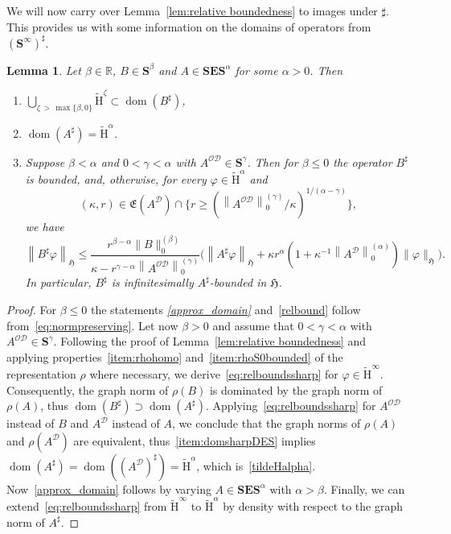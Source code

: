 \documentclass[10pt]{amsart}
\newtheorem{lemm}[theo]{Lemma}\newtheorem{prop}[theo]{Proposition}\newtheorem{coro}[theo]{Corollary}\newtheorem{conj}[theo]{Conjecture}
\theoremstyle{definition}\newtheorem{defi}[theo]{Definition}\newtheorem{rema}[theo]{Remark}\newtheorem{exam}[theo]{Example}\newtheorem{nota}[theo]{Notation}
\DeclareMathOperator{\dom}{dom}
\renewcommand{\mathsf}{\mathrm}
\newcommand{\sfH}{\mathsf{H}}
\newcommand{\R}{\mathbb R}
\newcommand{\CD}{\mathcal{D}}
\newcommand{\CO}{\mathcal{O}}
\newcommand{\BE}{\mathbf E}
\newcommand{\BS}{\mathbf S}
\newcommand{\FE}{\mathfrak{E}}
\newcommand{\FH}{\mathfrak H}
\renewcommand{\phi}{\varphi}
\renewcommand{\subseteq}{\subset}
\renewcommand{\supseteq}{\supset}
\newcommand{\er}{r}
\begin{document}
We will now carry over Lemma~\ref{lem:relative boundedness} to images under $\sharp$. This provides us with some information on the domains of operators from $(\BS^\infty)^\sharp$.
\begin{lemm}\label{lem:relboundsrho}
Let $\beta\in\R$, $B\in\BS^\beta$ and $A\in\BS\BE\BS^\alpha$ for some $\alpha>0$. Then
\begin{enumerate}
\item\label{approx_domain}
$\bigcup_{\zeta\,>\,\max\{\beta, 0\}}\widetilde{\sfH}^\zeta\subseteq\dom(B^\sharp)$,
\item\label{tildeHalpha}
$\dom(A^\sharp)=\widetilde{\sfH}^\alpha$.
\item\label{relbound}
Suppose $\beta < \alpha$ and $0 <\gamma < \alpha$ with $A^{\CO\CD}\in \BS^\gamma$. Then for $\beta\le 0$ the operator $B^\sharp$ is bounded, and, otherwise, for every $\phi\in\widetilde{\sfH}^\alpha$ and
\[
(\kappa, \er)\in\FE\left(A^\CD\right)\cap \Big\{\er
\geq\left(\left\|A^{\CO\CD}\right\|_0^{(\gamma)}/\kappa\right)^{1/(\alpha
-\gamma)}\Big\},
\]
we have
\begin{equation}\label{eq:relboundssharp}
\left\|B^\sharp\phi\right\|_{\FH} \le \frac{\er^{\beta -\alpha}\|B\|_0^{(\beta)}}{\kappa -\er^{\gamma -\alpha}\left\|A^{\CO\CD}\right\|_0^{(\gamma)}}\Big(\left\|A^\sharp\phi\right\|_{\FH} +\kappa \er^{\alpha}\left(1 +\kappa^{-1}\left\|A^\CD\right\|_0^{(\alpha)}\right)\|\phi\|_{\FH}\Big).
\end{equation}
In particular, $B^\sharp$ is infinitesimally $A^\sharp$-bounded in $\FH$.
\end{enumerate}
\end{lemm}

\begin{proof}
For $\beta\le 0$ the statements \emph{\eqref{approx_domain}} and~\eqref{relbound} follow from~\eqref{eq:normpreserving}. Let now $\beta>0$ and assume that $0 <\gamma < \alpha$ with $A^{\CO\CD}\in \BS^\gamma$. Following the proof of Lemma~\ref{lem:relative boundedness} and applying properties~\eqref{item:rhohomo} and~\eqref{item:rhoS0bounded} of the representation $\rho$ where necessary, we derive~\eqref{eq:relboundssharp} for $\phi\in\widetilde{\sfH}^\infty$. Consequently, the graph norm of $\rho(B)$ is dominated by the graph norm of $\rho(A)$, thus $\dom(B^\sharp)\supseteq \dom(A^\sharp)$. Applying~\eqref{eq:relboundssharp} for $A^{\CO\CD}$ instead of $B$ and $A^{\CD}$ instead of $A$, we conclude that the graph norms of $\rho(A)$ and $\rho(A^\CD)$ are equivalent, thus~\eqref{item:domsharpDES} implies $\dom(A^\sharp)=\dom((A^\CD)^\sharp)=\widetilde{\sfH}^\alpha$, which is~\eqref{tildeHalpha}. Now~\eqref{approx_domain} follows by varying $A\in \BS\BE\BS^\alpha$ with $\alpha >\beta$. Finally, we can extend~\eqref{eq:relboundssharp} from $\widetilde{\sfH}^\infty$ to $\widetilde{\sfH}^\alpha$ by density with respect to the graph norm of $A^\sharp$.
\end{proof}
\end{document}
